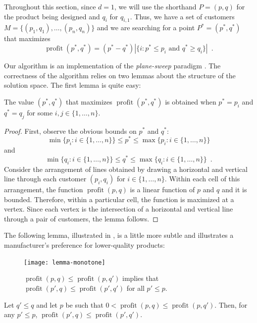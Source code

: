 \documentclass{llncs}
\newcommand{\val}{\operatorname{profit}}
\begin{document}
Throughout this section, since $d=1$, we will use the shorthand $P=(p,q)$
for the product being designed and $q_i$ for $q_{i,1}$.  Thus, we have a
set of customers $M=\{(p_1,q_1),\ldots,(p_{n},q_n)\}$ and we are searching
for a point $P^*=(p^*,q^*)$ that maximizes 
\[
   \val(p^*,q^*) = (p^*-q^*)
     |\{i : \mbox{$p^*\le p_i$ and $q^*\ge q_i$}\}|  \enspace .
\]

Our algorithm is an implementation of the \emph{plane-sweep} paradigm
\cite{bo79}. The correctness of the algorithm relies on two lemmas about
the structure of the solution space.  The first lemma is quite easy:
\begin{lem}
  The value $(p^*,q^*)$ that maximizes $\val(p^*,q^*)$ is obtained when
  $p^* = p_i$ and $q^*=q_j$ for some $i,j\in\{1,\ldots,n\}$.
\end{lem}

\begin{proof}
  First, observe the obvious bounds on $p^*$ and $q^*$:
  \[
     \min\{p_i:i\in\{1,\ldots,n\}\} \le p^* 
      \le \max\{p_i:i\in\{1,\ldots,n\}\} 
  \] 
  and 
  \[
     \min\{q_i:i\in\{1,\ldots,n\}\} \le q^* 
      \le \max\{q_i:i\in\{1,\ldots,n\}\} \enspace .
  \] 
  Consider the arrangement of lines obtained by drawing a
  horizontal and vertical line through each customer $(p_i,q_i)$
  for $i\in\{1,\ldots,n\}$.  Within each cell of this arrangement,
  the function $\val(p,q)$ is a linear function of $p$ and $q$ and it is
  bounded.  Therefore, within a particular cell, the function is maximized
  at a vertex.  Since each vertex is the intersection of a horizontal
  and vertical line through a pair of customers, the lemma follows.
\end{proof}

The following lemma, illustrated in , is a
little more subtle and illustrates a manufacturer's preference for
lower-quality products:
\begin{figure}
  \begin{center}
    \texttt{[image: lemma-monotone]}
  \end{center}
  \caption{$\val(p,q) \le \val(p,q')$ implies that $\val(p',q) \le
           \val(p',q')$ for all $p' \le p$.}
\end{figure}

\begin{lem}
  Let $q' \le q$ and let $p$ be such that $0 < \val(p,q) \le \val(p,q')$.
  Then, for any $p' \le p$, $\val(p',q) \le \val(p',q')$.
\end{lem}
\end{document}
